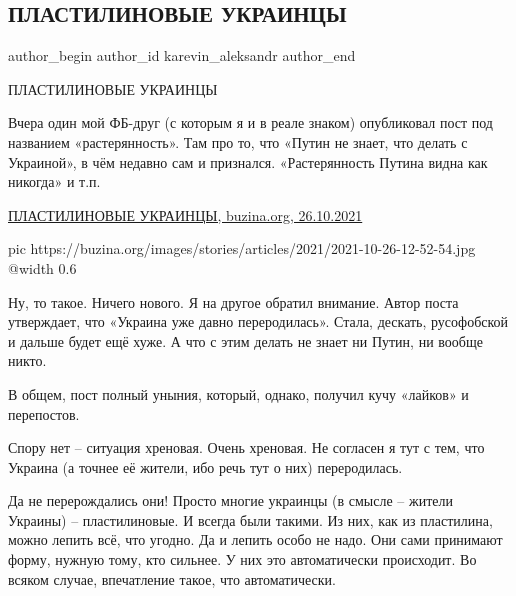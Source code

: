  
 
 
 
 
 
\subsection{ПЛАСТИЛИНОВЫЕ УКРАИНЦЫ}
\label{sec:25_10_2021.fb.karevin_aleksandr.1.plastilin_ukraincy}
 
\ifcmt
 author_begin
   author_id karevin_aleksandr
 author_end
\fi

ПЛАСТИЛИНОВЫЕ УКРАИНЦЫ

Вчера один мой ФБ-друг (с которым я и в реале знаком) опубликовал пост под
названием «растерянность». Там про то, что «Путин не знает, что делать с
Украиной», в чём недавно сам и признался. «Растерянность Путина видна как
никогда» и т.п.

\href{https://buzina.org/golos-naroda/4027-plastilin.html}{%
ПЛАСТИЛИНОВЫЕ УКРАИНЦЫ, buzina.org, 26.10.2021%
}

\ifcmt
  pic https://buzina.org/images/stories/articles/2021/2021-10-26-12-52-54.jpg
  @width 0.6
\fi

Ну, то такое. Ничего нового. Я на другое обратил внимание. Автор поста
утверждает, что «Украина уже давно переродилась». Стала, дескать, русофобской и
дальше будет ещё хуже. А что с этим делать не знает ни Путин, ни вообще никто. 

В общем, пост полный уныния, который, однако, получил кучу «лайков» и
перепостов.

Спору нет – ситуация хреновая. Очень хреновая. Не согласен я тут с тем, что
Украина (а точнее её жители, ибо речь тут о них) переродилась.

Да не перерождались они! Просто многие украинцы (в смысле – жители Украины) –
пластилиновые. И всегда были такими. Из них, как из пластилина, можно лепить
всё, что угодно. Да и лепить особо не надо. Они сами принимают форму, нужную
тому, кто сильнее. У них это автоматически происходит. Во всяком случае,
впечатление такое, что автоматически.

